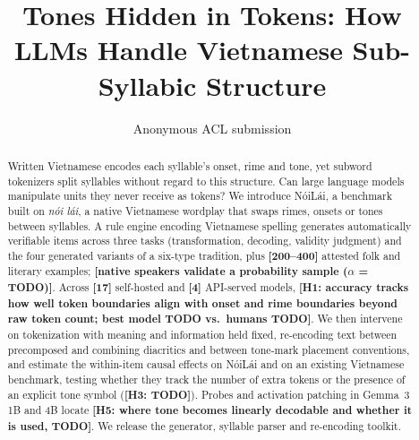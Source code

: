 \documentclass[11pt]{article}
\title{Tones Hidden in Tokens: How LLMs Handle Vietnamese Sub-Syllabic Structure}
\author{Anonymous ACL submission}
\newcommand{\placeholder}[1]{\textbf{[#1]}}
\newcommand{\placeholder}[1]{\textcolor{red}{[#1]}}
\newcommand{\hyp}[1]{\textbf{H#1}}
\newcommand{\vi}[1]{\textit{#1}}
\newcommand{\noilai}{NóiLái}
\begin{document}
\maketitle

\begin{abstract}
Written Vietnamese encodes each syllable's onset, rime and tone, yet subword tokenizers split syllables without regard to this structure. Can large language models manipulate units they never receive as tokens? We introduce \noilai{}, a benchmark built on \vi{nói lái}, a native Vietnamese wordplay that swaps rimes, onsets or tones between syllables. A rule engine encoding Vietnamese spelling generates \releaseNItems{} automatically verifiable items across three tasks (transformation, decoding, validity judgment) and the four generated variants of a six-type tradition, plus \placeholder{200--400} attested folk and literary examples; \placeholder{native speakers validate a probability sample ($\alpha$ = TODO)}. Across \placeholder{17} self-hosted and \placeholder{4} API-served models, \placeholder{\hyp{1}: accuracy tracks how well token boundaries align with onset and rime boundaries beyond raw token count; best model TODO vs.\ humans TODO}. We then intervene on tokenization with meaning and information held fixed, re-encoding text between precomposed and combining diacritics and between tone-mark placement conventions, and estimate the within-item causal effects on \noilai{} and on an existing Vietnamese benchmark, testing whether they track the number of extra tokens or the presence of an explicit tone symbol (\placeholder{\hyp{3}: TODO}). Probes and activation patching in Gemma~3 1B and 4B locate \placeholder{\hyp{5}: where tone becomes linearly decodable and whether it is used, TODO}. We release the generator, syllable parser and re-encoding toolkit.
\end{abstract}
















\appendix

\end{document}
